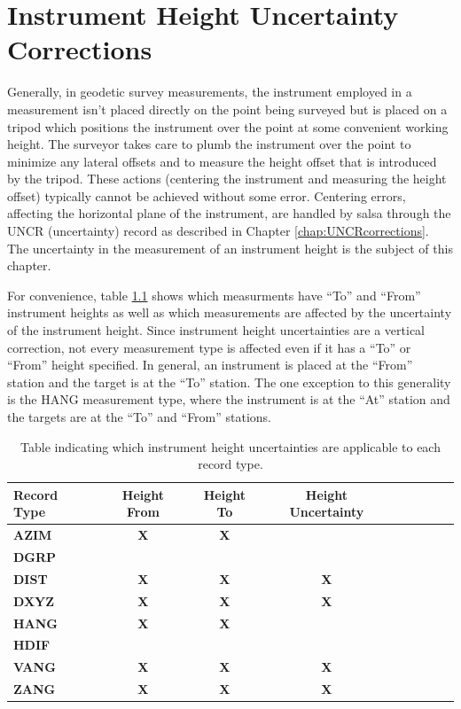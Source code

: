 \chapter{Instrument Height Uncertainty Corrections}
\label{chap:InstrHghtCorrections}
Generally, in geodetic survey measurements, the instrument employed in a measurement isn't placed directly on the point being surveyed but is placed on a tripod which positions the instrument over the point at some convenient working height. The surveyor takes care to plumb the instrument over the point to minimize any lateral offsets and to measure the height offset that is introduced by the tripod. These actions (centering the instrument and measuring the height offset) typically cannot be achieved without some error. Centering errors, affecting the horizontal plane of the instrument, are handled by \textsf{salsa} through the UNCR (uncertainty) record as described in Chapter \ref{chap:UNCRcorrections}. The uncertainty in the measurement of an instrument height is the subject of this chapter.

For convenience, table \ref{tab:InstrHGHTcorrections} shows which measurments have ``To'' and ``From'' instrument heights as well as which measurements are affected by the uncertainty of the instrument height. Since instrument height uncertainties are a vertical correction, not every measurement type is affected even if it has a ``To'' or ``From'' height specified. In general, an instrument is placed at the ``From'' station and the target is at the ``To'' station. The one exception to this generality is the HANG measurement type, where the instrument is at the ``At'' station and the targets are at the ``To'' and ``From'' stations.
\begin{table}[!htbp]
\centering
\begin{tabular}{|l|c|c|c|c|c|c|c|c|}\hline
\tiny{\textbf{Record Type}}&\tiny{\textbf{Height From}}&\tiny{\textbf{Height To}}&\tiny{\textbf{Height Uncertainty}}\\\hline
\tiny{\textbf{AZIM}}&\tiny{\textbf{X}}&\tiny{\textbf{X}}&\\\hline
\tiny{\textbf{DGRP}}&&&\\\hline
\tiny{\textbf{DIST}}&\tiny{\textbf{X}}&\tiny{\textbf{X}}&\tiny{\textbf{X}}\\\hline
\tiny{\textbf{DXYZ}}&\tiny{\textbf{X}}&\tiny{\textbf{X}}&\tiny{\textbf{X}}\\\hline
\tiny{\textbf{HANG}}&\tiny{\textbf{X}}&\tiny{\textbf{X}}&\\\hline
\tiny{\textbf{HDIF}}&&&\\\hline
\tiny{\textbf{VANG}}&\tiny{\textbf{X}}&\tiny{\textbf{X}}&\tiny{\textbf{X}}\\\hline
\tiny{\textbf{ZANG}}&\tiny{\textbf{X}}&\tiny{\textbf{X}}&\tiny{\textbf{X}}\\\hline
\end{tabular}
\caption{Table indicating which instrument height uncertainties are applicable to each record type.}
\label{tab:InstrHGHTcorrections}
\end{table}
